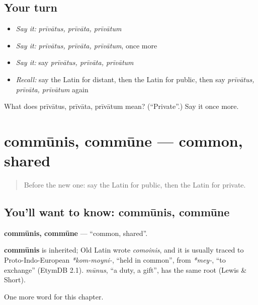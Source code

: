 \subsection*{Your turn}
\begin{itemize}
\raggedright
  \item \emph{Say it:} \emph{prīvātus, prīvāta, prīvātum}
  \item \emph{Say it:} \emph{prīvātus, prīvāta, prīvātum}, once more
  \item \emph{Say it:} say \emph{prīvātus, prīvāta, prīvātum}
  \item \emph{Recall:} say the Latin for distant, then the Latin for public, then say \emph{prīvātus, prīvāta, prīvātum} again
\end{itemize}

\begin{tcolorbox}[breakable,colback=teal!4,colframe=teal!35!black,title={Before you move on}]
What does prīvātus, prīvāta, prīvātum mean? (\textquotedblleft{}Private\textquotedblright{}.) Say it once more.
\end{tcolorbox}
\section[commūnis, commūne]{commūnis, commūne — common, shared}

\label{lesson:LA-C182-communis}



\begin{quote}
Before the new one: say the Latin for public, then the Latin for private.
\end{quote}

\subsection*{You'll want to know: commūnis, commūne}
\textbf{commūnis, commūne} — \textquotedblleft{}common, shared\textquotedblright{}.

\begin{cousinweb}
\textbf{commūnis} is inherited; Old Latin wrote \emph{comoinis}, and it is usually traced to Proto-Indo-European \emph{*kom-moyni-}, \textquotedblleft{}held in common\textquotedblright{}, from \emph{*mey-}, \textquotedblleft{}to exchange\textquotedblright{} (EtymDB 2.1). \emph{mūnus}, \textquotedblleft{}a duty, a gift\textquotedblright{}, has the same root (Lewis \& Short).
\end{cousinweb}

\begin{grammarlens}[title={What you've built}]
One more word for this chapter.
\end{grammarlens}

